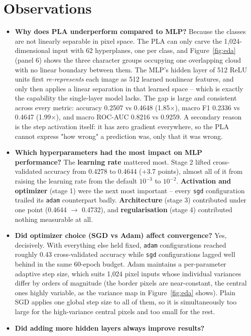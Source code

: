 \documentclass[12pt,a4paper]{article}
\DeclareRobustCommand{\_}{\textunderscore\allowbreak}
\begin{document}
\section{Observations}
\begin{itemize}
\item \textbf{Why does PLA underperform compared to MLP?} Because the classes are not linearly
separable in pixel space. The PLA can only carve the 1{,}024-dimensional input
with 62 hyperplanes, one per class, and Figure~\ref{fig:eda} (panel 6) shows
the three character groups occupying one overlapping cloud with no linear
boundary between them. The MLP's hidden layer of 512 ReLU units first
\emph{re-represents} each image as 512 learned nonlinear features, and only
then applies a linear separation in that learned space -- which is exactly the
capability the single-layer model lacks. The gap is large and consistent
across every metric: accuracy 0.2507 vs 0.4648 (1.85$\times$), macro F1
0.2336 vs 0.4647 (1.99$\times$), and macro ROC-AUC 0.8216 vs 0.9259. A
secondary reason is the step activation itself: it has zero gradient
everywhere, so the PLA cannot express "how wrong" a prediction was, only that
it was wrong.
\item \textbf{Which hyperparameters had the most impact on MLP performance?}
The \textbf{learning rate} mattered most.
Stage 2 lifted cross-validated accuracy from 0.4278 to 0.4644 (+3.7 points),
almost all of it from raising the learning rate from the default $10^{-3}$ to
$10^{-2}$. \textbf{Activation and optimizer} (stage 1) were the next most
important -- every \texttt{sgd} configuration trailed its \texttt{adam}
counterpart badly. \textbf{Architecture} (stage 3) contributed under one point
(0.4644 $\rightarrow$ 0.4732), and \textbf{regularisation} (stage 4)
contributed nothing measurable at all.
\item \textbf{Did optimizer choice (SGD vs Adam) affect convergence?}
Yes, decisively. With everything else held
fixed, \texttt{adam} configurations reached roughly 0.43 cross-validated
accuracy while \texttt{sgd} configurations lagged well behind in the same
60-epoch budget. Adam maintains a per-parameter adaptive step size, which suits
1{,}024 pixel inputs whose individual variances differ by orders of magnitude
(the border pixels are near-constant, the central ones highly variable, as the
variance map in Figure~\ref{fig:eda} shows). Plain SGD applies one global step
size to all of them, so it is simultaneously too large for the high-variance
central pixels and too small for the rest.
\item \textbf{Did adding more hidden layers always improve results?}

\end{itemize}
\end{document}
